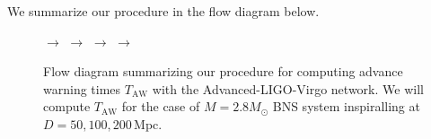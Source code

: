 \documentclass[amsmath,amssymb,aps,floats,amsfonts,notitlepage,superscriptaddress,eqsecnum,nofootinbib,10pt]{revtex4-1}
\begin{document}
 We summarize our procedure in the flow diagram below.
  \begin{figure}[h!]
 $\longrightarrow$ 
 $\longrightarrow$   $\longrightarrow$  
 $\longrightarrow$  
  \caption{Flow diagram summarizing our procedure for computing advance warning times $T_\text{AW}$ with the Advanced-LIGO-Virgo network. 
  We will compute $T_\text{AW}$ for the case of $M=2.8M_\odot$ BNS system inspiralling at $D=50,100,200\,$Mpc. 
  }\label{fig:flow}
\end{figure}
\end{document}

